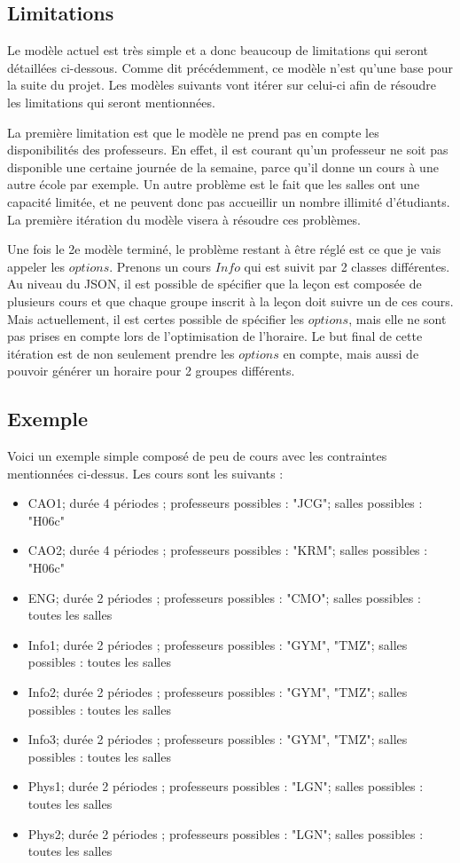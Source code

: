 \subsection{Limitations}
Le modèle actuel est très simple et a donc beaucoup de limitations qui seront détaillées ci-dessous. Comme dit précédemment, ce modèle n'est qu'une base pour la suite du projet. Les modèles suivants vont itérer sur celui-ci afin de résoudre les limitations qui seront mentionnées.

La première limitation est que le modèle ne prend pas en compte les disponibilités des professeurs. En effet, il est courant qu'un professeur ne soit pas disponible une certaine journée de la semaine, parce qu'il donne un cours à une autre école par exemple. Un autre problème est le fait que les salles ont une capacité limitée, et ne peuvent donc pas accueillir un nombre illimité d'étudiants. La première itération du modèle visera à résoudre ces problèmes.

Une fois le 2e modèle terminé, le problème restant à être réglé est ce que je vais appeler les $options$. Prenons un cours $Info$ qui est suivit par 2 classes différentes. Au niveau du JSON, il est possible de spécifier que la leçon est composée de plusieurs cours et que chaque groupe inscrit à la leçon doit suivre un de ces cours. Mais actuellement, il est certes possible de spécifier les $options$, mais elle ne sont pas prises en compte lors de l'optimisation de l'horaire. Le but final de cette itération est de non seulement prendre les $options$ en compte, mais aussi de pouvoir générer un horaire pour 2 groupes différents.

\subsection{Exemple}
Voici un exemple simple composé de peu de cours avec les contraintes mentionnées ci-dessus. Les cours sont les suivants :
\begin{itemize}
\item CAO1; durée 4 périodes ; professeurs possibles : "JCG"; salles possibles : "H06c"
\item CAO2; durée 4 périodes ; professeurs possibles : "KRM"; salles possibles : "H06c"
\item ENG; durée 2 périodes ; professeurs possibles : "CMO"; salles possibles : toutes les salles
\item Info1; durée 2 périodes ; professeurs possibles : "GYM", "TMZ"; salles possibles : toutes les salles
\item Info2; durée 2 périodes ; professeurs possibles : "GYM", "TMZ"; salles possibles : toutes les salles
\item Info3; durée 2 périodes ; professeurs possibles : "GYM", "TMZ"; salles possibles : toutes les salles
\item Phys1; durée 2 périodes ; professeurs possibles : "LGN"; salles possibles : toutes les salles
\item Phys2; durée 2 périodes ; professeurs possibles : "LGN"; salles possibles : toutes les salles
\end{itemize}

